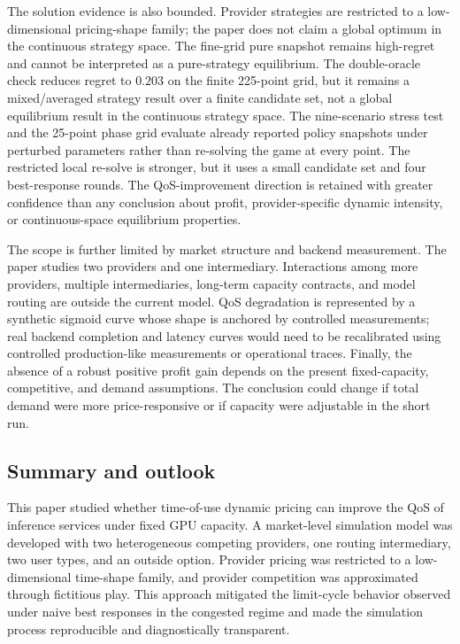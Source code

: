 \documentclass[11pt,a4paper]{article}
\begin{document}
The solution evidence is also bounded. Provider strategies are restricted to a low-dimensional pricing-shape family; the paper does not claim a global optimum in the continuous strategy space. The fine-grid pure snapshot remains high-regret and cannot be interpreted as a pure-strategy equilibrium. The double-oracle check reduces regret to $0.203$ on the finite 225-point grid, but it remains a mixed/averaged strategy result over a finite candidate set, not a global equilibrium result in the continuous strategy space. The nine-scenario stress test and the 25-point phase grid evaluate already reported policy snapshots under perturbed parameters rather than re-solving the game at every point. The restricted local re-solve is stronger, but it uses a small candidate set and four best-response rounds. The QoS-improvement direction is retained with greater confidence than any conclusion about profit, provider-specific dynamic intensity, or continuous-space equilibrium properties.

The scope is further limited by market structure and backend measurement. The paper studies two providers and one intermediary. Interactions among more providers, multiple intermediaries, long-term capacity contracts, and model routing are outside the current model. QoS degradation is represented by a synthetic sigmoid curve whose shape is anchored by controlled measurements; real backend completion and latency curves would need to be recalibrated using controlled production-like measurements or operational traces. Finally, the absence of a robust positive profit gain depends on the present fixed-capacity, competitive, and demand assumptions. The conclusion could change if total demand were more price-responsive or if capacity were adjustable in the short run.

\subsection{Summary and outlook}

This paper studied whether time-of-use dynamic pricing can improve the QoS of inference services under fixed GPU capacity. A market-level simulation model was developed with two heterogeneous competing providers, one routing intermediary, two user types, and an outside option. Provider pricing was restricted to a low-dimensional time-shape family, and provider competition was approximated through fictitious play. This approach mitigated the limit-cycle behavior observed under naive best responses in the congested regime and made the simulation process reproducible and diagnostically transparent.
\end{document}
